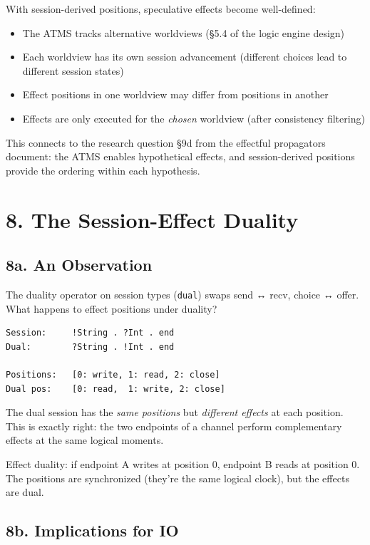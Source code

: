 \documentclass[11pt]{article}
\begin{document}
With session-derived positions, speculative effects become well-defined:

\begin{itemize}
\item The ATMS tracks alternative worldviews (§5.4 of the logic engine design)
\item Each worldview has its own session advancement (different choices lead to
different session states)
\item Effect positions in one worldview may differ from positions in another
\item Effects are only executed for the \emph{chosen} worldview (after consistency
filtering)
\end{itemize}

This connects to the research question §9d from the effectful propagators
document: the ATMS enables hypothetical effects, and session-derived positions
provide the ordering within each hypothesis.
\section{8. The Session-Effect Duality}
\label{sec:org24f4c26}

\subsection{8a. An Observation}
\label{sec:org7f15b75}

The duality operator on session types (\texttt{dual}) swaps send ↔ recv, choice ↔ offer.
What happens to effect positions under duality?

\begin{verbatim}
Session:     !String . ?Int . end
Dual:        ?String . !Int . end

Positions:   [0: write, 1: read, 2: close]
Dual pos:    [0: read,  1: write, 2: close]
\end{verbatim}

The dual session has the \emph{same positions} but \emph{different effects} at each
position. This is exactly right: the two endpoints of a channel perform
complementary effects at the same logical moments.

Effect duality: if endpoint A writes at position 0, endpoint B reads at
position 0. The positions are synchronized (they're the same logical clock),
but the effects are dual.
\subsection{8b. Implications for IO}
\label{sec:org2d07f06}
\end{document}
